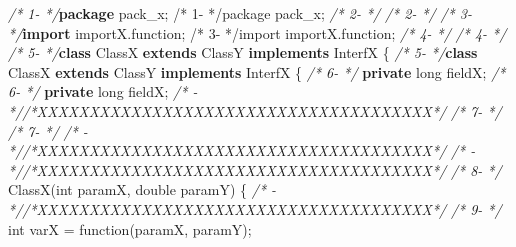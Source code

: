 \documentclass[
]{article}
\newenvironment{Shaded}{\begin{snugshade}}{\end{snugshade}}
\newcommand{\CommentTok}[1]{\textcolor[rgb]{0.56,0.35,0.01}{\textit{#1}}}
\newcommand{\DataTypeTok}[1]{\textcolor[rgb]{0.13,0.29,0.53}{#1}}
\newcommand{\FunctionTok}[1]{\textcolor[rgb]{0.00,0.00,0.00}{#1}}
\newcommand{\ImportTok}[1]{#1}
\newcommand{\KeywordTok}[1]{\textcolor[rgb]{0.13,0.29,0.53}{\textbf{#1}}}
\newcommand{\NormalTok}[1]{#1}
\begin{document}
\begin{landscape}

\small

\normalsize

\scriptsize

\begin{Shaded}
\begin{Highlighting}[]
\CommentTok{/*  1-                 */}\KeywordTok{package}\ImportTok{ pack_x;                                                /*  1-                 */package pack_x;}                                                
\CommentTok{/*  2-                 */}                                                               \CommentTok{/*  2-                 */}                                                               
\CommentTok{/*  3-                 */}\KeywordTok{import}\ImportTok{ importX.function;                                       /*  3-                 */import importX.function;}                                       
\CommentTok{/*  4-                 */}                                                               \CommentTok{/*  4-                 */}                                                               
\CommentTok{/*  5-                 */}\KeywordTok{class}\NormalTok{ ClassX }\KeywordTok{extends}\NormalTok{ ClassY }\KeywordTok{implements}\NormalTok{ InterfX \{               }\CommentTok{/*  5-                 */}\KeywordTok{class}\NormalTok{ ClassX }\KeywordTok{extends}\NormalTok{ ClassY }\KeywordTok{implements}\NormalTok{ InterfX \{               }
\CommentTok{/*  6-                 */}    \KeywordTok{private} \DataTypeTok{long}\NormalTok{ fieldX;                                       }\CommentTok{/*  6-                 */}    \KeywordTok{private} \DataTypeTok{long}\NormalTok{ fieldX;                                       }
\CommentTok{/*   -                 *//*XXXXXXXXXXXXXXXXXXXXXXXXXXXXXXXXXXXXXX*/}                     \CommentTok{/*  7-                 */}                                                               
\CommentTok{/*  7-                 */}                                                               \CommentTok{/*   -                 *//*XXXXXXXXXXXXXXXXXXXXXXXXXXXXXXXXXXXXXX*/}                     
\CommentTok{/*   -                 *//*XXXXXXXXXXXXXXXXXXXXXXXXXXXXXXXXXXXXXX*/}                     \CommentTok{/*  8-                 */}    \FunctionTok{ClassX}\NormalTok{(}\DataTypeTok{int}\NormalTok{ paramX, }\DataTypeTok{double}\NormalTok{ paramY) \{                                }
\CommentTok{/*   -                 *//*XXXXXXXXXXXXXXXXXXXXXXXXXXXXXXXXXXXXXX*/}                     \CommentTok{/*  9-                 */}        \DataTypeTok{int}\NormalTok{ varX = }\FunctionTok{function}\NormalTok{(paramX, paramY);                          }

\end{Highlighting}
\end{Shaded}
\end{landscape}
\end{document}
